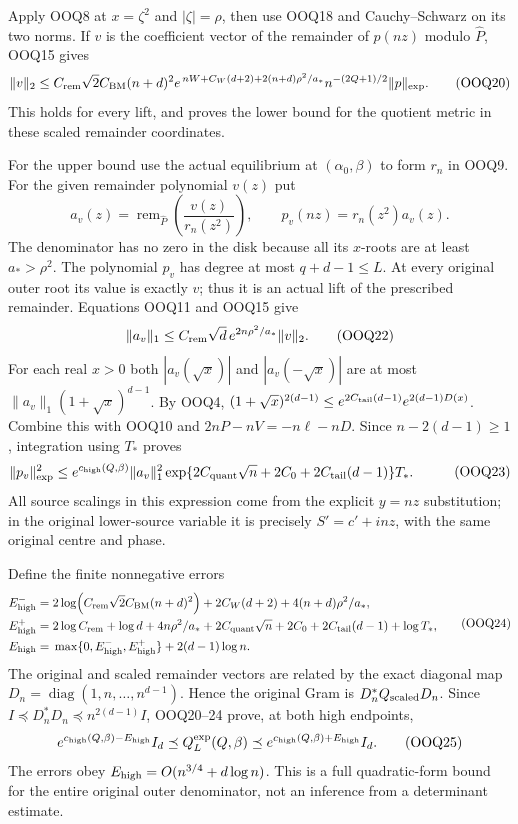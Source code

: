 \documentclass[11pt,a4paper]{article}
\begin{document}
Apply OOQ8 at $x=\zeta^2$ and $|\zeta|=\rho$, then use
OOQ18 and Cauchy--Schwarz on its two norms. If $v$ is the
coefficient vector of the remainder of $p(nz)$ modulo
$\widehat P$, OOQ15 gives
\[
\|v\|_2\le C_{\rm rem}\sqrt2 C_{\rm BM}(n+d)^2
 e^{\,nW+C_W(d+2)+2(n+d)\rho^2/a_*}
 n^{-(2Q+1)/2}\|p\|_{\exp}.
\tag{OOQ20}
\]
This holds for every lift, and proves the lower bound for the
quotient metric in these scaled remainder coordinates.

For the upper bound use the actual equilibrium at
$(\alpha_0,\beta)$ to form $r_n$ in OOQ9.
For the given remainder polynomial $v(z)$ put
\[
a_v(z)=\operatorname{rem}_{\widehat P}
                \left(\frac{v(z)}{r_n(z^2)}\right),\qquad
p_v(nz)=r_n(z^2)a_v(z).
\tag{OOQ21}
\]
The denominator has no zero in the disk because all its
$x$-roots are at least $a_*>\rho^2$.
The polynomial $p_v$ has degree at most $q+d-1\le L$.
At every original outer root its value is exactly $v$;
thus it is an actual lift of the prescribed remainder.
Equations OOQ11 and OOQ15 give
\[
\|a_v\|_1\le C_{\rm rem}\sqrt d\,
                  e^{2n\rho^2/a_*}\|v\|_2 .
\tag{OOQ22}
\]
For each real $x>0$ both
$|a_v(\sqrt x)|$ and $|a_v(-\sqrt x)|$ are at most
$\|a_v\|_1(1+\sqrt x)^{d-1}$.
By OOQ4,
$(1+\sqrt x)^{2(d-1)}
\le e^{2C_{\rm tail}(d-1)}e^{2(d-1)D(x)}$.
Combine this with OOQ10 and
$2nP-nV=-n\ell-nD$.
Since $n-2(d-1)\ge1$, integration using $T_*$ proves
\[
\begin{split}
\|p_v\|_{\exp}^2\le{}&
 e^{c_{\rm high}(Q,\beta)}
 \|a_v\|_1^2
 \exp\{2C_{\rm quant}\sqrt n+2C_0+
                   2C_{\rm tail}(d-1)\}T_* .
\end{split}\tag{OOQ23}
\]
All source scalings in this expression come from the explicit
$y=nz$ substitution; in the original lower-source variable it
is precisely $S'=c'+inz$, with the same original centre and phase.

Define the finite nonnegative errors
\[
\begin{split}
E^-_{\rm high}={}&
2\log\!\left(C_{\rm rem}\sqrt2 C_{\rm BM}(n+d)^2\right)
 +2C_W(d+2)+4(n+d)\rho^2/a_*,\\
E^+_{\rm high}={}&
2\log C_{\rm rem}+\log d+4n\rho^2/a_*
 +2C_{\rm quant}\sqrt n+2C_0+
                   2C_{\rm tail}(d-1)+\log T_*,\\
E_{\rm high}={}&
\max\{0,E^-_{\rm high},E^+_{\rm high}\}+2(d-1)\log n .
\end{split}\tag{OOQ24}
\]
The original and scaled remainder vectors are related by the
exact diagonal map
$D_n=\operatorname{diag}(1,n,\ldots,n^{d-1})$.
Hence the original Gram is $D_n^*Q_{\rm scaled}D_n$.
Since $I\preceq D_n^*D_n\preceq n^{2(d-1)}I$,
OOQ20--24 prove, at both high endpoints,
\[
 e^{c_{\rm high}(Q,\beta)-E_{\rm high}}I_d
 \preceq Q_L^{\exp}(Q,\beta)
 \preceq e^{c_{\rm high}(Q,\beta)+E_{\rm high}}I_d .
\tag{OOQ25}
\]
The errors obey
$E_{\rm high}=O(n^{3/4}+d\log n)$.
This is a full quadratic-form bound for the entire original
outer denominator, not an inference from a determinant estimate.
\end{document}
